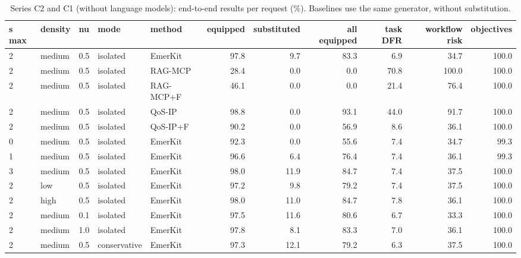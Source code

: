 \begin{table}[!ht]\centering\caption{Series C2 and C1 (without language models): end-to-end results per request (\%). Baselines use the same generator, without substitution.}\label{tab:c2}\scriptsize
\begin{tabular}{lllllrrrrrr}\toprule
s max & density & nu & mode & method & equipped & substituted & all equipped & task DFR & workflow risk & objectives \\ \midrule
2 & medium & 0.5 & isolated & EmerKit & 97.8 & 9.7 & 83.3 & 6.9 & 34.7 & 100.0 \\
2 & medium & 0.5 & isolated & RAG-MCP & 28.4 & 0.0 & 0.0 & 70.8 & 100.0 & 100.0 \\
2 & medium & 0.5 & isolated & RAG-MCP+F & 46.1 & 0.0 & 0.0 & 21.4 & 76.4 & 100.0 \\
2 & medium & 0.5 & isolated & QoS-IP & 98.8 & 0.0 & 93.1 & 44.0 & 91.7 & 100.0 \\
2 & medium & 0.5 & isolated & QoS-IP+F & 90.2 & 0.0 & 56.9 & 8.6 & 36.1 & 100.0 \\
0 & medium & 0.5 & isolated & EmerKit & 92.3 & 0.0 & 55.6 & 7.4 & 34.7 & 99.3 \\
1 & medium & 0.5 & isolated & EmerKit & 96.6 & 6.4 & 76.4 & 7.4 & 36.1 & 99.3 \\
3 & medium & 0.5 & isolated & EmerKit & 98.0 & 11.9 & 84.7 & 7.4 & 37.5 & 100.0 \\
2 & low & 0.5 & isolated & EmerKit & 97.2 & 9.8 & 79.2 & 7.4 & 37.5 & 100.0 \\
2 & high & 0.5 & isolated & EmerKit & 98.0 & 11.0 & 84.7 & 7.8 & 36.1 & 100.0 \\
2 & medium & 0.1 & isolated & EmerKit & 97.5 & 11.6 & 80.6 & 6.7 & 33.3 & 100.0 \\
2 & medium & 1.0 & isolated & EmerKit & 97.8 & 8.1 & 83.3 & 7.0 & 36.1 & 100.0 \\
2 & medium & 0.5 & conservative & EmerKit & 97.3 & 12.1 & 79.2 & 6.3 & 37.5 & 100.0 \\
\bottomrule\end{tabular}\end{table}
